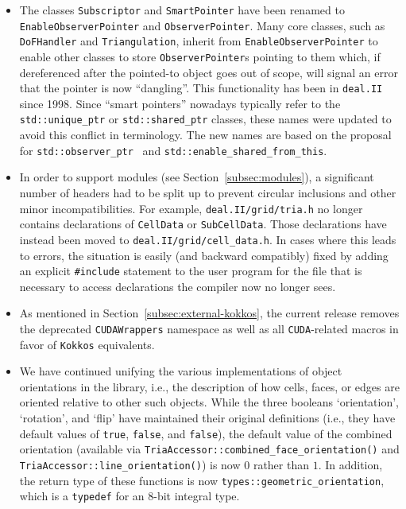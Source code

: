 \documentclass{ansarticle-preprint}
\newcommand{\specialword}[1]{\texttt{#1}}
\newcommand{\dealii}{{\specialword{deal.II}}\xspace}
\newcommand{\kokkos}{{\specialword{Kokkos}}\xspace}
\begin{document}
\begin{itemize}
  \item The classes \texttt{Subscriptor} and \texttt{SmartPointer} have been
    renamed to \texttt{EnableObserverPointer} and \texttt{ObserverPointer}. Many
    core classes, such as \texttt{DoFHandler} and \texttt{Triangulation},
    inherit from \texttt{EnableObserverPointer} to enable other classes to store
    \texttt{ObserverPointer}s pointing to them which, if dereferenced after the
    pointed-to object goes out of scope, will signal an error that the
    pointer is now ``dangling''. This
    functionality has been in \dealii since 1998. Since ``smart pointers''
    nowadays typically refer to the \texttt{std::unique\_ptr} or
    \texttt{std::shared\_ptr} classes, these
    names were updated to avoid this conflict in terminology. The new names are
    based on the proposal for \texttt{std::observer\_ptr}~\cite{Brown2014} and
    \texttt{std::enable\_shared\_from\_this}.

  \item In order to support modules (see Section~\ref{subsec:modules}), a
    significant number of headers had to be split up to prevent circular
    inclusions and other minor incompatibilities. For example,
    \texttt{deal.II/grid/tria.h} no longer contains declarations of \texttt{CellData} or
    \texttt{SubCellData}. Those declarations have instead been moved to
    \texttt{deal.II/grid/cell\_data.h}. In cases where this leads to errors,
    the situation is easily (and backward compatibly) fixed by adding an explicit
    \texttt{\#include} statement to the user program for the file that is necessary to
    access declarations the compiler now no longer sees.

  \item As mentioned in
    Section~\ref{subsec:external-kokkos}, the current release
    removes the deprecated \texttt{CUDAWrappers} namespace as well
    as all \texttt{CUDA}-related macros in favor of \kokkos
    equivalents.

  \item We have continued unifying the various implementations of object
    orientations in the library, i.e., the description of how cells,
    faces, or edges are oriented relative to other such objects. While the three booleans `orientation', `rotation',
    and `flip' have maintained their original definitions (i.e., they have default
    values of \texttt{true}, \texttt{false}, and \texttt{false}), the default
    value of the combined orientation (available via
    \texttt{TriaAccessor::combined\_face\_orientation()} and
    \texttt{TriaAccessor::line\_orientation()}) is now $0$ rather than $1$. In
    addition, the return type of these functions is now
    \texttt{types::geometric\_orientation}, which is a \texttt{typedef} for an
    8-bit integral type.


\end{itemize}
\end{document}
